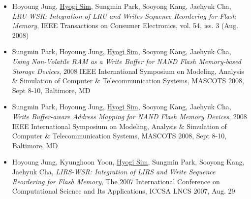 \begin{itemize}
        {\it Performance Tradeoffs in Using NVRAM Write Buffer for Flash Memory-based
        Storage Devices},
        IEEE Transactions on Computers, vol. 58, iss. 6 (Jun. 2009), pp. 744-758
    \item Hoyoung Jung, \underline{Hyogi Sim}, Sungmin Park, Sooyong Kang, Jaehyuk Cha,
        {\it LRU-WSR: Integration of LRU and Writes Sequence Reordering for Flash
        Memory},
        IEEE Transactions on Consumer Electronics, vol. 54, iss. 3 (Aug. 2008)
    \item Sungmin Park, Hoyoung Jung, \underline{Hyogi Sim}, Sooyong Kang, Jaehyuk Cha,
        {\it Using Non-Volatile RAM as a Write Buffer for NAND Flash Memory-based
        Storage Devices},
        2008 IEEE International Symposium on Modeling, Analysis \& Simulation of
        Computer \& Telecommunication Systems, MASCOTS 2008, Sept 8-10, Baltimore, MD
    \item Sungmin Park, Hoyoung Jung, \underline{Hyogi Sim}, Sooyong Kang, Jaehyuk Cha,
        {\it Write Buffer-aware Address Mapping for NAND Flash Memory Devices},
        2008 IEEE International Symposium on Modeling, Analysis \& Simulation of
        Computer \& Telecommunication Systems, MASCOTS 2008, Sept 8-10, Baltimore, MD
    \item Hoyoung Jung, Kyunghoon Yoon, \underline{Hyogi Sim},
        Sungmin Park, Sooyong Kang, Jaehyuk Cha,
        {\it LIRS-WSR: Integration of LIRS and Write Sequence Reordering for Flash
        Memory},
        The 2007 International Conference on Computational Science and Its
        Applications, ICCSA LNCS 2007, Aug. 29
\end{itemize}

